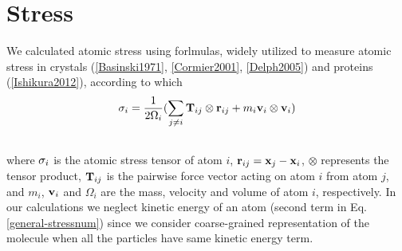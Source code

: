 \documentclass[letterpaper,10pt,english]{sphinxmanual}
\begin{document}
\section{Stress}
\label{general:id11}\label{general:numerstress}
We calculated atomic stress using forlmulas, widely utilized to measure atomic stress in crystals ({\hyperref[general:basinski1971]{{[}Basinski1971{]}}}, {\hyperref[general:cormier2001]{{[}Cormier2001{]}}}, {\hyperref[general:delph2005]{{[}Delph2005{]}}}) and proteins ({\hyperref[general:ishikura2012]{{[}Ishikura2012{]}}}), according to which
\label{general:equation-stressnum}\begin{gather}
\begin{split}{\bf \sigma}_{i} = \frac{1}{2\Omega_{i}}(\sum_{j \neq i}{{\bf T}_{ij} \otimes {\bf r}_{ij}} + m_{i}{\bf v}_{i} \otimes {\bf v}_{i})\end{split}\label{general-stressnum}\\\begin{split}\end{split}\notag
\end{gather}
where ${\bf \sigma}_{i}$ is the atomic stress tensor of atom $i$, ${\bf r}_{ij}={\bf x}_{j}-{\bf x}_{i}$, $\otimes$ represents the tensor product, ${\bf T}_{ij}$ is the pairwise force vector acting on atom $i$ from atom $j$, and $m_{i}$, ${\bf v}_{i}$ and $\Omega_{i}$ are the mass, velocity and volume of atom $i$, respectively. In our calculations we neglect kinetic energy of an atom (second term in Eq. \eqref{general-stressnum}) since we consider coarse-grained representation of the molecule when all the particles have same kinetic energy term.
\end{document}

